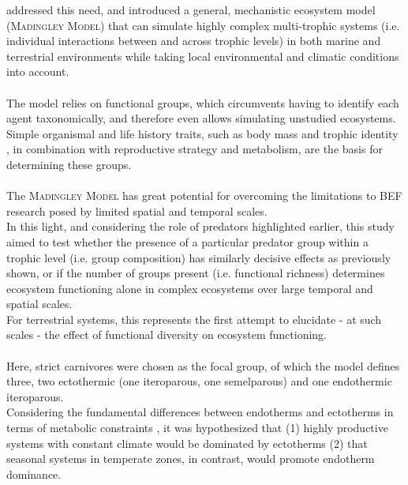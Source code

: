 \cite{Harfoot2014} addressed this need, and introduced a general, mechanistic ecosystem model (\textsc{Madingley Model}) that can simulate highly complex multi-trophic systems (i.e. individual interactions between and across trophic levels) in both marine and terrestrial environments while taking local environmental and climatic conditions into account. \\\\
The model relies on functional groups, which circumvents having to identify each agent taxonomically, and therefore even allows simulating unstudied ecosystems. 
Simple organismal and life history traits, such as body mass and trophic identity  \citep[][shown to be adequate for explaining BEF relationships]{Berlow2009,Wood2010,Saguin2014,Legagneux2014}, in combination with reproductive strategy and metabolism, are the basis for determining these groups.
\\\\
The \textsc{Madingley Model} has great potential for overcoming the limitations to BEF research posed by limited spatial and temporal scales. \\
In this light, and considering the role of predators highlighted earlier, this study aimed to test whether the presence of a particular predator group within a trophic level (i.e. group composition) has similarly decisive effects as previously shown, or if the number of groups present (i.e. functional richness) determines ecosystem functioning alone in complex ecosystems over large temporal and spatial scales. \\ 
For terrestrial systems, this represents the first attempt to elucidate - at such scales - the effect of functional diversity on ecosystem functioning.
\\\\
Here, strict carnivores were chosen as the focal group, of which the model defines three, two ectothermic (one iteroparous, one semelparous) and one endothermic iteroparous. 
\\
Considering the fundamental differences between endotherms and ectotherms in terms of metabolic constraints \citep{Nagy2005}, it was hypothesized that (1) highly productive systems with constant climate would be dominated by ectotherms (2) that seasonal systems in temperate zones, in contrast, would promote endotherm dominance.


